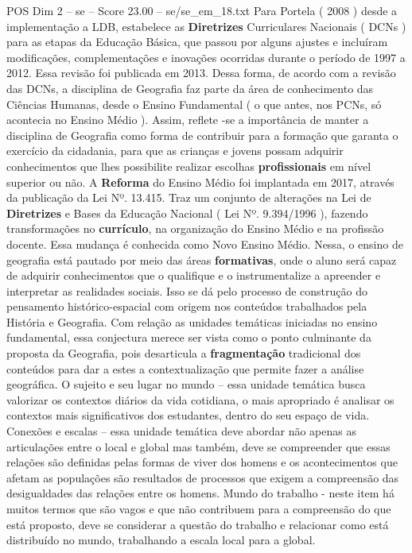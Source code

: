 \begin{textsample}{POS Dim 2 – se – Score 23.00 – se/se\_em\_18.txt}
Para Portela ( 2008 ) desde a implementação a LDB, estabelece as \textbf{Diretrizes} Curriculares Nacionais ( DCNs ) para as etapas da Educação Básica, que passou por alguns ajustes e incluíram modificações, complementações e inovações ocorridas durante o período de 1997 a 2012.
Essa revisão foi publicada em 2013.
Dessa forma, de acordo com a revisão das DCNs, a disciplina de Geografia faz parte da área de conhecimento das Ciências Humanas, desde o Ensino Fundamental ( o que antes, nos PCNs, só acontecia no Ensino Médio ).
Assim, reflete -se a importância de manter a disciplina de Geografia como forma de contribuir para a formação que garanta o exercício da cidadania, para que as crianças e jovens possam adquirir conhecimentos que lhes possibilite realizar escolhas \textbf{profissionais} em nível superior ou não.
A \textbf{Reforma} do Ensino Médio foi implantada em 2017, através da publicação da Lei Nº. 13.415.
Traz um conjunto de alterações na Lei de \textbf{Diretrizes} e Bases da Educação Nacional ( Lei Nº. 9.394/1996 ), fazendo transformações no \textbf{currículo}, na organização do Ensino Médio e na profissão docente.
Essa mudança é conhecida como Novo Ensino Médio.
Nessa, o ensino de geografia está pautado por meio das áreas \textbf{formativas}, onde o aluno será capaz de adquirir conhecimentos que o qualifique e o instrumentalize a apreender e interpretar as realidades sociais.
Isso se dá pelo processo de construção do pensamento histórico-espacial com origem nos conteúdos trabalhados pela História e Geografia.
Com relação as unidades temáticas iniciadas no ensino fundamental, essa conjectura merece ser vista como o ponto culminante da proposta da Geografia, pois desarticula a \textbf{fragmentação} tradicional dos conteúdos para dar a estes a contextualização que permite fazer a análise geográfica.
O sujeito e seu lugar no mundo – essa unidade temática busca valorizar os contextos diários da vida cotidiana, o mais apropriado é analisar os contextos mais significativos dos estudantes, dentro do seu espaço de vida.
Conexões e escalas – essa unidade temática deve abordar não apenas as articulações entre o local e global mas também, deve se compreender que essas relações são definidas pelas formas de viver dos homens e os acontecimentos que afetam as populações são resultados de processos que exigem a compreensão das desigualdades das relações entre os homens.
Mundo do trabalho - neste item há muitos termos que são vagos e que não contribuem para a compreensão do que está proposto, deve se considerar a questão do trabalho e relacionar como está distribuído no mundo, trabalhando a escala local para a global.

\end{textsample}
